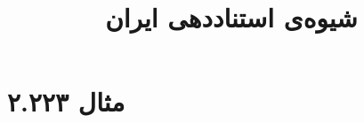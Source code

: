 \documentclass[a4paper,10pt]{article}
\begin{document}
\title{شیوه‌ی استناددهی ایران}
\author{}
\date{}
\maketitle



\section*{مثال ۲.۲۲۳}

\cite{کتابخانه1385}\\
\cite{روانشناسی1385}\\
\begin{latin}\noindent
\cite{evaston2000}\\
\cite{fas2000}\\
\end{latin}






\end{document}
